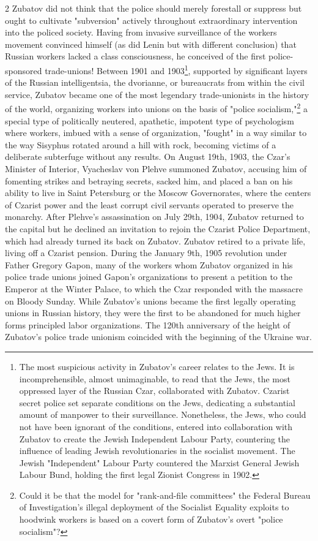 \documentclass[10pt,a4paper,twoside]{article} %
\begin{document}
\begin{multicols}{2}
{\newline \indent Zubatov did not think that the police should merely forestall or suppress but ought to cultivate "subversion" actively throughout extraordinary intervention into the policed society. Having from invasive surveillance of the workers movement convinced himself (as did Lenin but with different conclusion) that Russian workers lacked a class consciousness,  he conceived of the first police-sponsored trade-unions! Between 1901 and 1903\footnote{The most suspicious activity in Zubatov's career relates to the Jews. It is incomprehensible, almost unimaginable, to read that the Jews, the most oppressed layer of the Russian Czar, collaborated with Zubatov. Czarist secret police set separate conditions on the Jews, dedicating a substantial amount of manpower to their surveillance. Nonetheless, the Jews, who could not have been ignorant of the conditions, entered into collaboration with Zubatov to create the Jewish Independent Labour Party, countering the influence of leading Jewish revolutionaries in the socialist movement. The Jewish "Independent" Labour Party countered the Marxist General Jewish Labour Bund, holding the first legal Zionist Congress in 1902.}, supported by significant layers of the Russian intelligentsia, the dvorianne, or bureaucrats from within the civil service, Zubatov became one of the most legendary trade-unionists in the history of the world, organizing workers into unions on the basis of "police socialism,"\footnote{Could it be that the model for "rank-and-file committees" the Federal Bureau of Investigation's illegal deployment of the Socialist Equality exploits to hoodwink workers is based on a covert form of Zubatov's overt "police socialism"?} a special type of politically neutered, apathetic, impotent type of psychologism where workers, imbued with a sense of organization, "fought" in a way similar to the way Sisyphus rotated around a hill with rock, becoming victims of a deliberate subterfuge without any results. On August 19th, 1903, the Czar's Minister of Interior, Vyacheslav von Plehve summoned Zubatov, accusing him of fomenting strikes and betraying secrets, sacked him, and placed a ban on his ability to live in Saint Petersburg or the Moscow Governorates, where the centers of Czarist power and the least corrupt civil servants operated to preserve the monarchy. After Plehve's assassination on July 29th, 1904, Zubatov returned to the capital but he declined an invitation to rejoin the Czarist Police Department, which had already turned its back on Zubatov. Zubatov retired to a private life, living off a Czarist pension. During the January 9th, 1905 revolution under Father Gregory Gapon, many of the workers whom Zubatov organized in his police trade unions joined Gapon's organizations to present a petition to the Emperor at the Winter Palace, to which the Czar responded with the massacre on Bloody Sunday. 
\newline \indent While Zubatov's unions became the first legally operating unions in Russian history, they were the first to be abandoned for much higher forms principled labor organizations. The 120th anniversary of the height of Zubatov's police trade unionism coincided with the beginning of the Ukraine war.
} 


\end{multicols}
\end{document}
